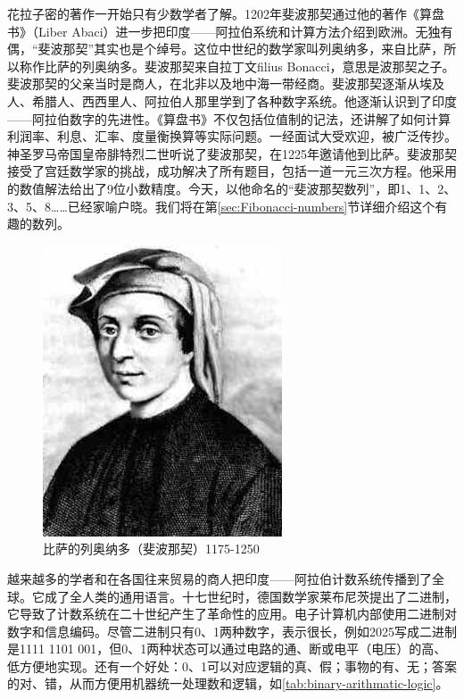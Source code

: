 \documentclass[b5paper]{article}
\begin{document}
花拉子密的著作一开始只有少数学者了解。1202年斐波那契通过他的著作《算盘书》（Liber Abaci）进一步把印度——阿拉伯系统和计算方法介绍到欧洲。无独有偶，“斐波那契”其实也是个绰号。这位中世纪的数学家叫列奥纳多，来自比萨，所以称作比萨的列奥纳多。斐波那契来自拉丁文filius Bonacci，意思是波那契之子。斐波那契的父亲当时是商人，在北非以及地中海一带经商。斐波那契逐渐从埃及人、希腊人、西西里人、阿拉伯人那里学到了各种数字系统。他逐渐认识到了印度——阿拉伯数字的先进性。《算盘书》不仅包括位值制的记法，还讲解了如何计算利润率、利息、汇率、度量衡换算等实际问题。一经面试大受欢迎，被广泛传抄。神圣罗马帝国皇帝腓特烈二世听说了斐波那契，在1225年邀请他到比萨。斐波那契接受了宫廷数学家的挑战，成功解决了所有题目，包括一道一元三次方程。他采用的数值解法给出了9位小数精度\cite{Gies-Carney-24}。今天，以他命名的“斐波那契数列”，即1、1、2、3、5、8……已经家喻户晓。我们将在第\ref{sec:Fibonacci-numbers}节详细介绍这个有趣的数列。

\begin{figure}[htbp]
 \centering
 \includegraphics[scale=0.35]{img/Fibonacci}
 \caption{比萨的列奥纳多（斐波那契）1175-1250}
 \label{fig:Fibonacci}
\end{figure}

\label{sec:binary-numerals} 
越来越多的学者和在各国往来贸易的商人把印度——阿拉伯计数系统传播到了全球。它成了全人类的通用语言。十七世纪时，德国数学家莱布尼茨提出了二进制，它导致了计数系统在二十世纪产生了革命性的应用。电子计算机内部使用二进制对数字和信息编码。尽管二进制只有0、1两种数字，表示很长，例如2025写成二进制是1111 1101 001，但0、1两种状态可以通过电路的通、断或电平（电压）的高、低方便地实现。还有一个好处：0、1可以对应逻辑的真、假；事物的有、无；答案的对、错，从而方便用机器统一处理数和逻辑，如\cref{tab:binary-arithmatic-logic}。
\end{document}
